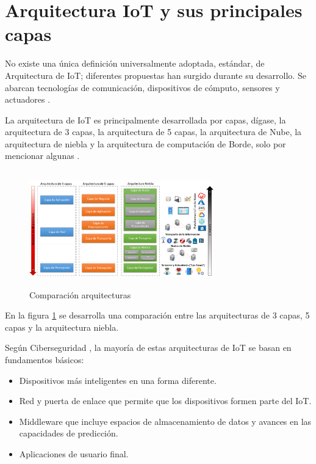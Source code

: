     \section{Arquitectura IoT y sus principales capas}\label{sec:arquitecturas}

    No existe una única definición universalmente adoptada, estándar, de Arquitectura de IoT; diferentes propuestas han surgido durante su desarrollo. Se abarcan tecnologías de comunicación, dispositivos de cómputo, sensores y actuadores \cite{ioT_en_Cosas_de_salud}.
    
    La arquitectura de IoT es principalmente desarrollada por capas, dígase, la arquitectura de 3 capas, la arquitectura de 5 capas, la arquitectura de Nube, la arquitectura de niebla y la arquitectura de computación de Borde, solo por mencionar algunas \cite{arquitecturaIEEE}.\\

    \begin{figure}[H]
        \centering
        \includegraphics[width=8cm, height=5cm]{imagenes/Comparacion-arquitecturas-1024x535}
        \caption{Comparación arquitecturas}
        \label{imag:comparacionArquitecturas}
    \end{figure}

    En la figura \ref{imag:comparacionArquitecturas} se desarrolla una comparación entre las arquitecturas de 3 capas, 5 capas y la arquitectura niebla.

    Según Ciberseguridad \cite{capasIoTciberseguridad}, la mayoría de estas arquitecturas de IoT se basan en fundamentos básicos:
    \begin{itemize}
        \item Dispositivos más inteligentes en una forma diferente.
        \item Red y puerta de enlace que permite que los dispositivos formen parte del IoT.
        \item Middleware que incluye espacios de almacenamiento de datos y avances en las capacidades de predicción.
        \item Aplicaciones de usuario final.
    \end{itemize}

